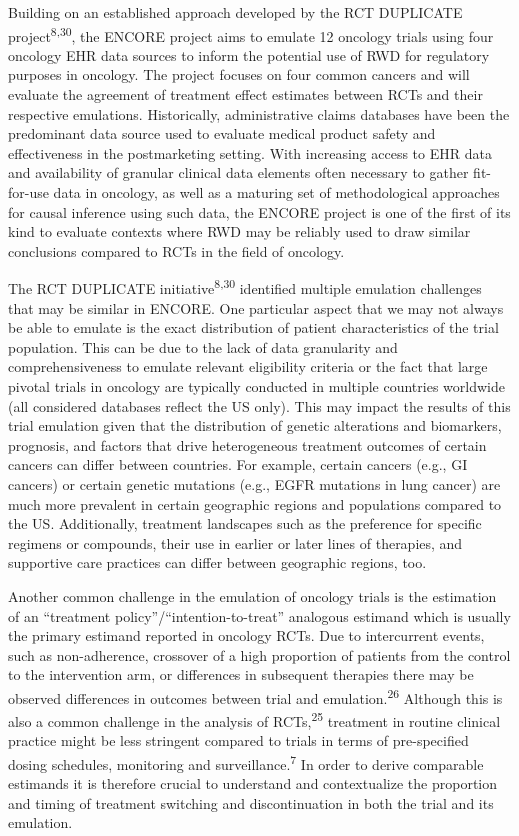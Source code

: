 \documentclass[
  letterpaper,
  DIV=11,
  numbers=noendperiod]{scrartcl}
\begin{document}
Building on an established approach developed by the RCT DUPLICATE
project\textsuperscript{8,30}, the ENCORE project aims to emulate 12
oncology trials using four oncology EHR data sources to inform the
potential use of RWD for regulatory purposes in oncology. The project
focuses on four common cancers and will evaluate the agreement of
treatment effect estimates between RCTs and their respective emulations.
Historically, administrative claims databases have been the predominant
data source used to evaluate medical product safety and effectiveness in
the postmarketing setting. With increasing access to EHR data and
availability of granular clinical data elements often necessary to
gather fit-for-use data in oncology, as well as a maturing set of
methodological approaches for causal inference using such data, the
ENCORE project is one of the first of its kind to evaluate contexts
where RWD may be reliably used to draw similar conclusions compared to
RCTs in the field of oncology.

The RCT DUPLICATE initiative\textsuperscript{8,30} identified multiple
emulation challenges that may be similar in ENCORE. One particular
aspect that we may not always be able to emulate is the exact
distribution of patient characteristics of the trial population. This
can be due to the lack of data granularity and comprehensiveness to
emulate relevant eligibility criteria or the fact that large pivotal
trials in oncology are typically conducted in multiple countries
worldwide (all considered databases reflect the US only). This may
impact the results of this trial emulation given that the distribution
of genetic alterations and biomarkers, prognosis, and factors that drive
heterogeneous treatment outcomes of certain cancers can differ between
countries. For example, certain cancers (e.g., GI cancers) or certain
genetic mutations (e.g., EGFR mutations in lung cancer) are much more
prevalent in certain geographic regions and populations compared to the
US. Additionally, treatment landscapes such as the preference for
specific regimens or compounds, their use in earlier or later lines of
therapies, and supportive care practices can differ between geographic
regions, too.

Another common challenge in the emulation of oncology trials is the
estimation of an ``treatment policy''/``intention-to-treat'' analogous
estimand which is usually the primary estimand reported in oncology
RCTs. Due to intercurrent events, such as non-adherence, crossover of a
high proportion of patients from the control to the intervention arm, or
differences in subsequent therapies there may be observed differences in
outcomes between trial and emulation.\textsuperscript{26} Although this
is also a common challenge in the analysis of RCTs,\textsuperscript{25}
treatment in routine clinical practice might be less stringent compared
to trials in terms of pre-specified dosing schedules, monitoring and
surveillance.\textsuperscript{7} In order to derive comparable estimands
it is therefore crucial to understand and contextualize the proportion
and timing of treatment switching and discontinuation in both the trial
and its emulation.
\end{document}
